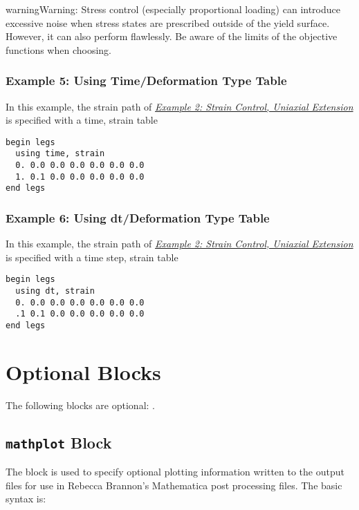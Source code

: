 \documentclass[letterpaper,10pt,english]{sphinxmanual}
\begin{document}
\begin{notice}{warning}{Warning:}
Stress control (especially proportional loading) can introduce excessive noise
when stress states are prescribed outside of the yield surface. However, it
can also perform flawlessly. Be aware of the limits of the objective functions
when choosing.
\end{notice}


\subsubsection{Example 5: Using Time/Deformation Type Table}
\label{Files/input_file_formatting:example-5-using-time-deformation-type-table}\label{Files/input_file_formatting:example-5}
In this example, the strain path of {\hyperref[Files/input_file_formatting:example-2]{\emph{Example 2: Strain Control, Uniaxial Extension}}} is specified with a time,
strain table

\begin{Verbatim}[commandchars=\\\{\}]
begin legs
  using time, strain
  0. 0.0 0.0 0.0 0.0 0.0 0.0
  1. 0.1 0.0 0.0 0.0 0.0 0.0
end legs
\end{Verbatim}


\subsubsection{Example 6: Using dt/Deformation Type Table}
\label{Files/input_file_formatting:example-6-using-dt-deformation-type-table}
In this example, the strain path of {\hyperref[Files/input_file_formatting:example-2]{\emph{Example 2: Strain Control, Uniaxial Extension}}} is specified with a time
step, strain table

\begin{Verbatim}[commandchars=\\\{\}]
begin legs
  using dt, strain
  0. 0.0 0.0 0.0 0.0 0.0 0.0
  .1 0.1 0.0 0.0 0.0 0.0 0.0
end legs
\end{Verbatim}


\section{Optional Blocks}
\label{Files/input_file_formatting:optional-blocks}\label{Files/input_file_formatting:id3}
The following blocks are optional:  .


\subsection{\texttt{mathplot} Block}
\label{Files/input_file_formatting:mathplot-block}
The  block is used to specify optional plotting information written
to the  output files for use in Rebecca Brannon's
Mathematica post processing files. The basic syntax is:
\end{document}
